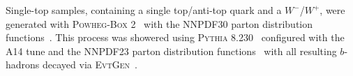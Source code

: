 Single-top samples, containing a single top/anti-top quark and a
$W^{-}$/$W^{+}$, were generated with \textsc{Powheg-Box}
2~\cite{Campbell2012} with the NNPDF30 parton distribution
functions~\cite{Lai:2010vv}. This process was showered using \textsc{Pythia}
8.230~\cite{Sjostrand:2014zea} configured with the A14 tune and the NNPDF23
parton distribution functions~\cite{Carrazza:2013axa} with all resulting
$b$-hadrons decayed via \textsc{EvtGen}~\cite{LANGE2001152}.
